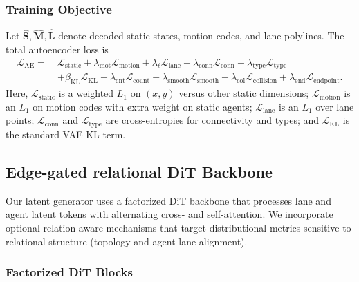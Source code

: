\documentclass{article}
\theoremstyle{plain}
\theoremstyle{definition}
\theoremstyle{remark}
\begin{document}
\subsubsection{Training Objective}
Let \(\widehat{\mathbf{S}}, \widehat{\mathbf{M}}, \widehat{\mathbf{L}}\) denote decoded static states, motion codes, and lane polylines.
The total autoencoder loss is
\begin{equation}
\begin{split}
    \mathcal{L}_{\mathrm{AE}} =\: & \mathcal{L}_{\mathrm{static}}
    + \lambda_{\mathrm{mot}}\mathcal{L}_{\mathrm{motion}}
    + \lambda_{\ell}\mathcal{L}_{\mathrm{lane}}
    + \lambda_{\mathrm{conn}}\mathcal{L}_{\mathrm{conn}}
    + \lambda_{\mathrm{type}}\mathcal{L}_{\mathrm{type}} \\
    & + \beta_{\mathrm{KL}}\mathcal{L}_{\mathrm{KL}}
    + \lambda_{\mathrm{cnt}}\mathcal{L}_{\mathrm{count}}
    + \lambda_{\mathrm{smooth}}\mathcal{L}_{\mathrm{smooth}}
    + \lambda_{\mathrm{col}}\mathcal{L}_{\mathrm{collision}}
    + \lambda_{\mathrm{end}}\mathcal{L}_{\mathrm{endpoint}}.
\end{split}
\end{equation}
Here, \(\mathcal{L}_{\mathrm{static}}\) is a weighted \(L_1\) on \((x,y)\) versus other static dimensions; \(\mathcal{L}_{\mathrm{motion}}\) is an \(L_1\)
on motion codes with extra weight on static agents; \(\mathcal{L}_{\mathrm{lane}}\) is an \(L_1\) over lane points; \(\mathcal{L}_{\mathrm{conn}}\) and
\(\mathcal{L}_{\mathrm{type}}\) are cross-entropies for connectivity and types; and \(\mathcal{L}_{\mathrm{KL}}\) is the standard VAE KL term.



\subsection{Edge-gated relational DiT Backbone}
\label{app:dit}

Our latent generator uses a factorized DiT backbone that processes lane and agent latent tokens with alternating cross- and self-attention.
We incorporate optional relation-aware mechanisms that target distributional metrics sensitive to relational structure (topology and agent-lane alignment).

\subsubsection{Factorized DiT Blocks}
\end{document}
